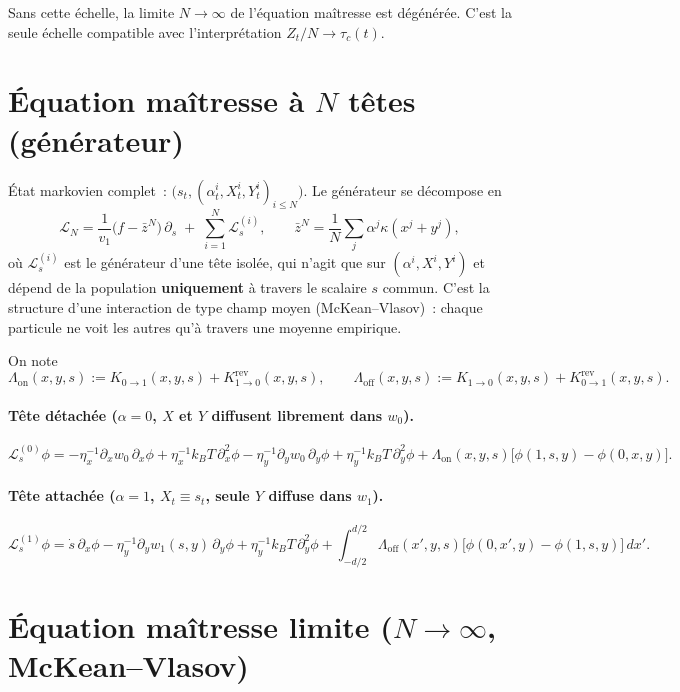 \documentclass[11pt,a4paper]{article}
\newcommand{\Lon}{\Lambda_{\mathrm{on}}}
\newcommand{\Loff}{\Lambda_{\mathrm{off}}}
\theoremstyle{plain}
\theoremstyle{definition}
\begin{document}
Sans cette \'echelle, la limite $N\to\infty$ de l'\'equation ma\^itresse est d\'eg\'en\'er\'ee. C'est la seule \'echelle compatible avec l'interpr\'etation $Z_t/N \to \tau_c(t)$.

\section{\'Equation ma\^itresse \`a $N$ t\^etes (g\'en\'erateur)}

\'Etat markovien complet~: $\big(s_t,(\alpha_t^i,X_t^i,Y_t^i)_{i\le N}\big)$. Le g\'en\'erateur se d\'ecompose en
\[
\mathcal L_N = \frac{1}{v_1}\big(f-\bar z^N\big)\,\partial_s \;+\; \sum_{i=1}^N \mathcal L^{(i)}_{s},\qquad \bar z^N=\frac1N\sum_j \alpha^j\kappa(x^j+y^j),
\]
o\`u $\mathcal L^{(i)}_s$ est le g\'en\'erateur d'une t\^ete isol\'ee, qui n'agit que sur $(\alpha^i,X^i,Y^i)$ et d\'epend de la population \textbf{uniquement} \`a travers le scalaire $s$ commun. C'est la structure d'une interaction de type champ moyen (McKean--Vlasov)~: chaque particule ne voit les autres qu'\`a travers une moyenne empirique.

On note
\[
\Lon(x,y,s):=K_{0\to1}(x,y,s)+K_{1\to0}^{\mathrm{rev}}(x,y,s), \qquad
\Loff(x,y,s):=K_{1\to0}(x,y,s)+K_{0\to1}^{\mathrm{rev}}(x,y,s).
\]

\paragraph{T\^ete d\'etach\'ee ($\alpha=0$, $X$ et $Y$ diffusent librement dans $w_0$).}
\[
\mathcal L^{(0)}_s\phi = -\eta_x^{-1}\partial_xw_0\,\partial_x\phi+\eta_x^{-1}k_BT\,\partial_x^2\phi -\eta_y^{-1}\partial_yw_0\,\partial_y\phi+\eta_y^{-1}k_BT\,\partial_y^2\phi + \Lon(x,y,s)\big[\phi(1,s,y)-\phi(0,x,y)\big].
\]

\paragraph{T\^ete attach\'ee ($\alpha=1$, $X_t\equiv s_t$, seule $Y$ diffuse dans $w_1$).}
\[
\mathcal L^{(1)}_s\phi = \dot s\,\partial_x\phi -\eta_y^{-1}\partial_yw_1(s,y)\,\partial_y\phi+\eta_y^{-1}k_BT\,\partial_y^2\phi + \int_{-d/2}^{d/2}\Loff(x',y,s)\big[\phi(0,x',y)-\phi(1,s,y)\big]\,dx'.
\]

\section{\'Equation ma\^itresse limite ($N\to\infty$, McKean--Vlasov)}
\end{document}
